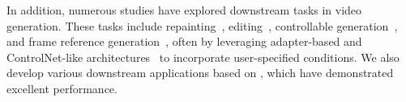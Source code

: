 In addition, numerous studies have explored downstream tasks in video generation. These tasks include repainting~\citep{sdinp,propainter}, editing~\citep{sdedit,ip2p,magicbrush,wang2023videocomposer,dreamVideo2}, controllable generation~\citep{controlnet,scedit,wang2024unianimate}, and frame reference generation~\citep{cogvideox,i2vadapter}, often by leveraging adapter-based and ControlNet-like architectures~\citep{controlnet,chu2024diffcomplete} to incorporate user-specified conditions. We also develop various downstream applications based on \method, which have demonstrated excellent performance.



